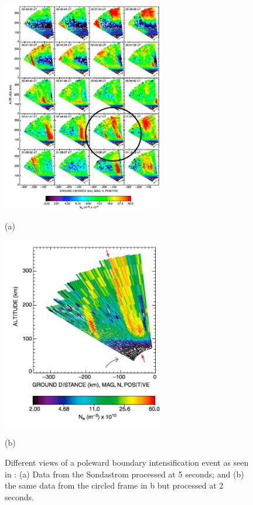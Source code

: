 \begin{figure}[htb]
  \begin{minipage}[t]{0.49\linewidth}\centering
    \includegraphics[width=7cm]{pbiall}
    \medskip
    \centerline{(a)}
  \end{minipage}\hfill
  \begin{minipage}[t]{0.49\linewidth}\centering
    \includegraphics[width=7cm]{pbifast}
    \medskip
    \centerline{(b)}
  \end{minipage}
  \caption{Different views of a poleward boundary intensification event as seen in \cite{Semeter:2005fo}: (a) Data from the Sondastrom processed at 5 seconds; and (b) the same data from the circled frame in b but processed at 2 seconds. }
  \label{fig:Sampling}
\end{figure}

